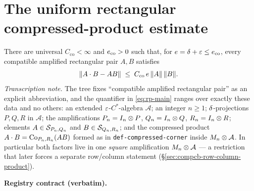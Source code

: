 \section{The uniform rectangular compressed-product estimate}\label{sec:compcb-rectangular-product}

\begin{lemma}\label{lem:compcb-rectangular-product}
There are universal $C_{\mathrm{co}}<\infty$ and $e_{\mathrm{co}}>0$ such that, for
$e=\delta+\varepsilon\le e_{\mathrm{co}}$, every compatible amplified rectangular pair
$A,B$ satisfies
\begin{equation}\label{eq:rp-main}
  \lVert A\mathbin{\cdot} B-AB\rVert\;\le\;C_{\mathrm{co}}\,e\,\lVert A\rVert\,\lVert B\rVert.
\end{equation}
\emph{Transcription note.} The tree fixes ``compatible amplified rectangular pair'' as an
explicit abbreviation, and the quantifier in \eqref{eq:rp-main} ranges over exactly these
data and no others: an extended $\varepsilon$-$C^*$-algebra $\mathcal A$; an integer $n\ge1$;
$\delta$-projections $P,Q,R$ in $\mathcal A$; the amplifications
$P_n=I_{n}\otimes P$, $Q_n=I_{n}\otimes Q$, $R_n=I_{n}\otimes R$; elements
$A\in\mathcal S_{P_n,Q_n}$ and $B\in\mathcal S_{Q_n,R_n}$; and the compressed product
$A\mathbin{\cdot} B=\mathrm{Co}_{P_n,R_n}(AB)$ formed as in \texttt{def-compressed-corner} inside
$M_{n}\otimes \mathcal A$. In particular both factors live in one \emph{square}
amplification $M_{n}\otimes \mathcal A$ --- a restriction that later forces a separate
row/column statement (\S\ref{sec:compcb-row-column-product}).
\end{lemma}

\noindent\textbf{Registry contract (verbatim).}


